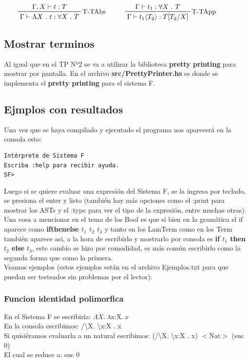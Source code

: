 \documentclass[12pt, titlepage, a4paper]{article}
\begin{document}
\begin{displaymath}
    \prftree[r]{T-TAbs}{\Gamma, X \vdash t : T}{\Gamma \vdash \Lambda X \ . \ t : \forall X \ . \ T} \hspace{1cm}
    \prftree[r]{T-TApp}{\Gamma \vdash t_1 : \forall X \ . \ T}{\Gamma \vdash t_1 \langle T_2 \rangle : T[T_2/X]} \hspace{1cm}
\end{displaymath}

\subsection{Mostrar terminos}
Al igual que en el TP Nº2 \cite{tp2:lambdaCalculoSimpleTipado} se va a utilizar la biblioteca \textbf{pretty printing} para mostrar por 
pantalla. En el archivo
\textbf{src/PrettyPrinter.hs} es donde se implementa el \textbf{pretty printing} para el sistema F.

\subsection{Ejmplos con resultados}
Una vez que se haya compilado y ejecutado el programa nos aparecerá en la consola esto:

\begin{verbatim}
Intérprete de Sistema F
Escriba :help para recibir ayuda.
SF>
\end{verbatim}


Luego si se quiere evaluar una expresión del Sistema F, se la ingresa por teclado, se presiona el enter y listo 
(también hay más opciones como el :print para mostrar los ASTs y el :type para ver el tipo de la expresión, entre muchas otras). \\

Una cosa a mencionar en el tema de los Bool es que si bien en la gramática el if aparece como \textbf{ifthenelse $t_1$ $t_2$ $t_3$} y 
tanto en los LamTerm como en los Term también aparece asi, a la hora de escribirlo y mostrarlo por consola es 
\textbf{if $t_1$ then $t_2$ else $t_3$}, este cambio se hizo por comodidad, es más común escribirlo como la segunda forma que como 
la primera.\\

Veamos ejemplos (estos ejemplos están en el archivo Ejemplos.txt para que puedan ser testeados sin problemas por el lector):

\subsubsection{Funcion identidad polimorfica}
\noindent En el Sistema F se escribiría: $\Lambda X.\ \lambda $x:X$. \ x$ \\
En la consola escribimos: /\textbackslash X. \textbackslash x:X . x \\
Si quisiéramos evaluarla a un natural escribimos: (/\textbackslash X. \textbackslash x:X . x)  $<$Nat$>$ (suc 0) \\
El cual se reduce a: suc 0
\end{document}
